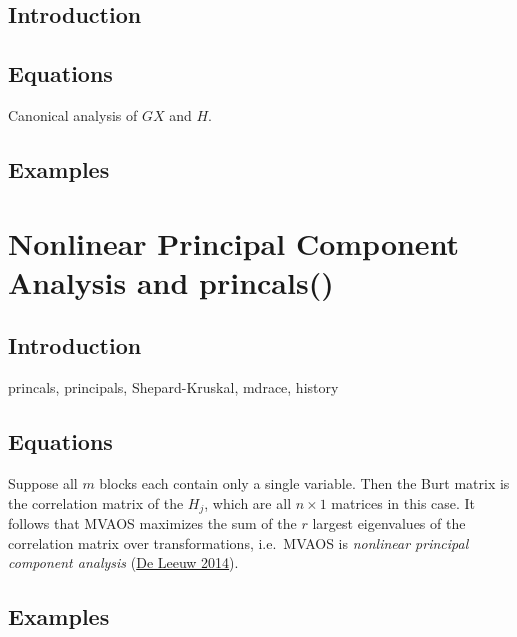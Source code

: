 \documentclass[
  12pt,
]{book}
\begin{document}
\hypertarget{introduction-2}{%
\section{Introduction}\label{introduction-2}}

\hypertarget{equations-1}{%
\section{Equations}\label{equations-1}}

Canonical analysis of \(GX\) and \(H\).

\hypertarget{examples-1}{%
\section{Examples}\label{examples-1}}

\hypertarget{nonlinear-principal-component-analysis-and-princals}{%
\chapter{Nonlinear Principal Component Analysis and princals()}\label{nonlinear-principal-component-analysis-and-princals}}

\hypertarget{introduction-3}{%
\section{Introduction}\label{introduction-3}}

princals, principals, Shepard-Kruskal, mdrace, history

\hypertarget{equations-2}{%
\section{Equations}\label{equations-2}}

Suppose all \(m\) blocks each contain only a single variable. Then the Burt matrix is the correlation matrix of the \(H_j\), which are all \(n\times 1\) matrices in this case. It follows that MVAOS maximizes the sum of the \(r\) largest eigenvalues of the correlation matrix over transformations, i.e.~MVAOS is \emph{nonlinear principal component analysis} (\protect\hyperlink{ref-deleeuw_C_14}{De Leeuw 2014}).

\hypertarget{examples-2}{%
\section{Examples}\label{examples-2}}
\end{document}
